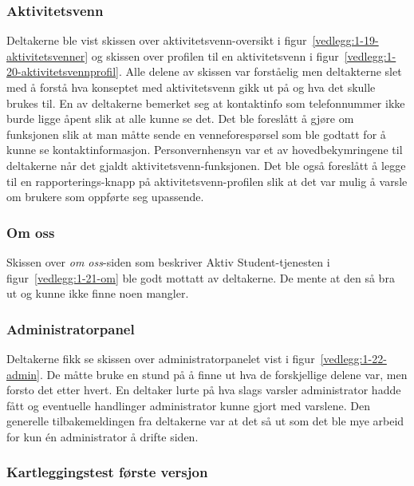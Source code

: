 \subsubsection{Aktivitetsvenn}

Deltakerne ble vist skissen over aktivitetsvenn-oversikt i figur~\ref{vedlegg:1-19-aktivitetsvenner} og skissen over profilen til en aktivitetsvenn i figur~\ref{vedlegg:1-20-aktivitetsvennprofil}. Alle delene av skissen var forståelig men deltakterne slet med å forstå hva konseptet med aktivitetsvenn gikk ut på og hva det skulle brukes til. En av deltakerne bemerket seg at kontaktinfo som telefonnummer ikke burde ligge åpent slik at alle kunne se det. Det ble foreslått å gjøre om funksjonen slik at man måtte sende en venneforespørsel som ble godtatt for å kunne se kontaktinformasjon. Personvernhensyn var et av hovedbekymringene til deltakerne når det gjaldt aktivitetsvenn-funksjonen. Det ble også foreslått å legge til en rapporterings-knapp på aktivitetsvenn-profilen slik at det var mulig å varsle om brukere som oppførte seg upassende.


\subsubsection{Om oss}

Skissen over {\em  om oss}-siden som beskriver Aktiv Student-tjenesten i figur~\ref{vedlegg:1-21-om} ble godt mottatt av deltakerne. De mente at den så bra ut og kunne ikke finne noen mangler.

\subsubsection{Administratorpanel}

Deltakerne fikk se skissen over administratorpanelet vist i figur~\ref{vedlegg:1-22-admin}. De måtte bruke en stund på å finne ut hva de forskjellige delene var, men forsto det etter hvert. En deltaker lurte på hva slags varsler administrator hadde fått og eventuelle handlinger administrator kunne gjort med varslene. Den generelle tilbakemeldingen fra deltakerne var at det så ut som det ble mye arbeid for kun én administrator å drifte siden.


\subsubsection{Kartleggingstest første versjon}
\label{section:test-kartlegging-hjul1.0}

